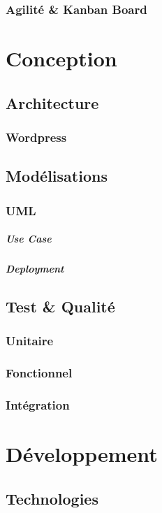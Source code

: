 \documentclass[11pt,a4paper]{report}
\begin{document}
		\subsection{Agilité \& Kanban Board}

\chapter{Conception}
	\section{Architecture}
        \subsection{Wordpress}
	\section{Modélisations}
		\subsection{UML}
			\paragraph{Use Case}
			\paragraph{Deployment}
	\section{Test \& Qualité}
		\subsection{Unitaire}
		\subsection{Fonctionnel}
		\subsection{Intégration}

\chapter{Développement}
	\section{Technologies}
\end{document}
